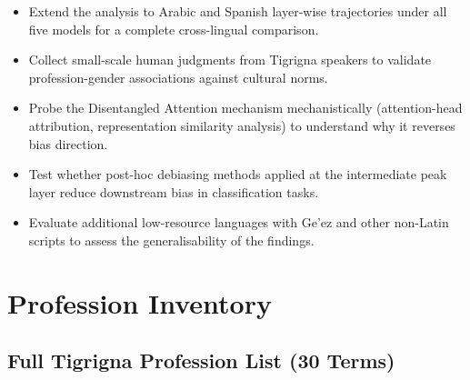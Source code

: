 \documentclass[10pt]{article}
\begin{document}
\begin{itemize}[noitemsep,leftmargin=*]
  \item Extend the analysis to Arabic and Spanish layer-wise trajectories
        under all five models for a complete cross-lingual comparison.
  \item Collect small-scale human judgments from Tigrigna speakers to
        validate profession-gender associations against cultural norms.
  \item Probe the Disentangled Attention mechanism mechanistically
        (attention-head attribution, representation similarity analysis)
        to understand why it reverses bias direction.
  \item Test whether post-hoc debiasing methods \citep{bolukbasi2016man}
        applied at the intermediate peak layer reduce downstream bias in
        classification tasks.
  \item Evaluate additional low-resource languages with Ge'ez and other
        non-Latin scripts to assess the generalisability of the findings.
\end{itemize}

\clearpage



\appendix
\section{Profession Inventory}

\subsection{Full Tigrigna Profession List (30 Terms)}
\end{document}
